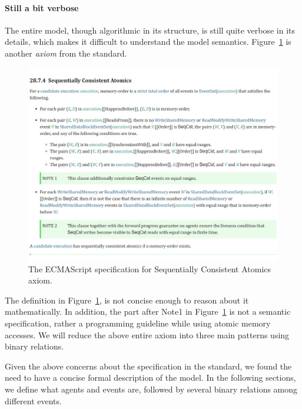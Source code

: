 \paragraph{Still a bit verbose}
    
    The entire model, though algorithmic in its structure, is still quite verbose in its details, which makes it difficult to understand the model semantics. 
    Figure~\ref{model:Std3} is another \textit{axiom} from the standard. 
    \begin{figure}[H]
        \centering 
        \includegraphics[scale=0.6]{3.ECMAScriptMemoryModel/ECMAScriptStdSeqCnsAt.pdf}
        \caption{The ECMAScript specification for Sequentially Consistent Atomics axiom.}
        \label{model:Std3}
    \end{figure}
    The definition in Figure~\ref{model:Std3}, is not concise enough to reason about it mathematically. 
    In addition, the part after Note1 in Figure~\ref{model:Std3} is not a semantic specification, rather a programming guideline while using 
    atomic memory accesses. 
    We will reduce the above entire axiom into three main patterns using binary relations.

Given the above concerns about the specification in the standard, we found the need to have a concise formal description of the model. 
In the following sections, we define what agents and events are, followed by several binary relations among different events.
